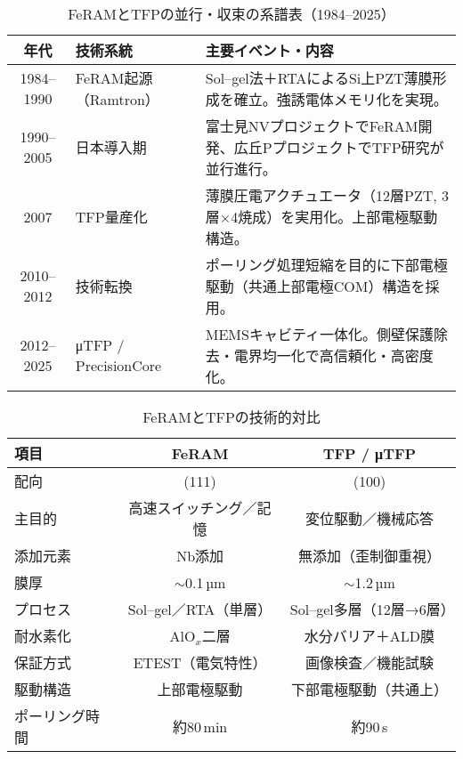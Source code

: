 \documentclass[conference]{IEEEtran}
\begin{document}
\begin{table}[!t]
\centering
\caption{FeRAMとTFPの並行・収束の系譜表（1984–2025）}
\label{tab:timeline}
\renewcommand{\arraystretch}{1.15}
\begin{tabular}{@{}cll@{}}
\toprule
\textbf{年代} & \textbf{技術系統} & \textbf{主要イベント・内容} \\ \midrule
1984--1990 & FeRAM起源（Ramtron） &
Sol--gel法＋RTAによるSi上PZT薄膜形成を確立。強誘電体メモリ化を実現。\\[2pt]

1990--2005 & 日本導入期 &
富士見NVプロジェクトでFeRAM開発、広丘PプロジェクトでTFP研究が並行進行。\\[2pt]

2007 & TFP量産化 &
薄膜圧電アクチュエータ（12層PZT, 3層×4焼成）を実用化。上部電極駆動構造。\\[2pt]

2010--2012 & 技術転換 &
ポーリング処理短縮を目的に下部電極駆動（共通上部電極COM）構造を採用。\\[2pt]

2012--2025 & μTFP / PrecisionCore &
MEMSキャビティ一体化。側壁保護除去・電界均一化で高信頼化・高密度化。\\
\bottomrule
\end{tabular}
\end{table}

\begin{table}[!t]
\centering
\caption{FeRAMとTFPの技術的対比}
\label{tab:compare}
\renewcommand{\arraystretch}{1.1}
\setlength{\tabcolsep}{2.5pt} %
\scriptsize %
\begin{tabular}{@{}lcc@{}}
\toprule
\textbf{項目} & \textbf{FeRAM} & \textbf{TFP / μTFP} \\
\midrule
配向 & (111) & (100) \\
主目的 & 高速スイッチング／記憶 & 変位駆動／機械応答 \\
添加元素 & Nb添加 & 無添加（歪制御重視） \\
膜厚 & $\sim$0.1\,µm & $\sim$1.2\,µm \\
プロセス & Sol--gel／RTA（単層） & Sol--gel多層（12層→6層） \\
耐水素化 & AlO$_x$二層 & 水分バリア＋ALD膜 \\
保証方式 & ETEST（電気特性） & 画像検査／機能試験 \\
駆動構造 & 上部電極駆動 & 下部電極駆動（共通上） \\
ポーリング時間 & 約80\,min & 約90\,s \\
\bottomrule
\end{tabular}
\normalsize %
\end{table}
\end{document}
